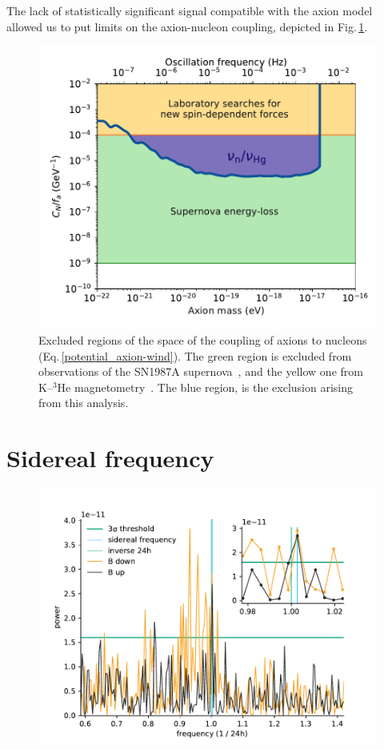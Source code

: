 The lack of statistically significant signal compatible with the axion model allowed us to put limits on the axion-nucleon coupling, depicted in Fig.\,\ref{fig:axions_wind_limits}. 

\begin{figure}
  \centering
  \includegraphics[width=0.8\linewidth]{gfx/axions/psi_ill_axion_wind_limits_v1.pdf}
  \caption{Excluded regions of the space of the coupling of axions to nucleons (Eq.\,\ref{potential_axion-wind}). The green region is excluded from observations of the SN1987A supernova~\cite{PhysRevX.7.041034}, and the yellow one from K--${}^3$He magnetometry~\cite{Romalis2009_NF}. The blue region, is the exclusion arising from this analysis.}\label{fig:axions_wind_limits}
\end{figure}




\section{Sidereal frequency}
\begin{figure}
  \centering
  \includegraphics[width=0.8\linewidth]{gfx/axions/winddeltah4mm_sidereal.pdf}
  \caption{\cite{Romalis2009_NF}}\label{fig:axions_sidereal_detection}
\end{figure}

